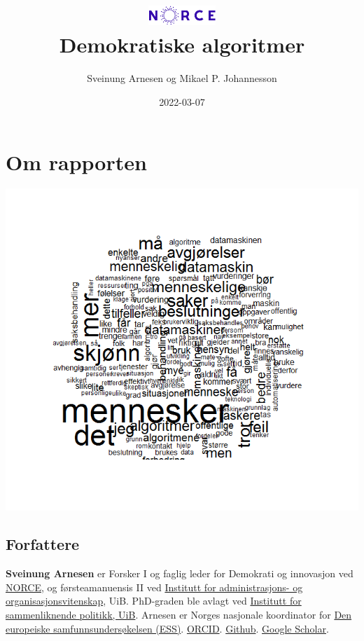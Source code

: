 \documentclass[
]{book}
\title{\includegraphics[width=1in,height=\textheight]{norce_logo.png}\\
Demokratiske algoritmer}
\author{Sveinung Arnesen og Mikael P. Johannesson}
\date{2022-03-07}
\begin{document}
\maketitle

{
\setcounter{tocdepth}{1}
\tableofcontents
}
\hypertarget{om}{%
\chapter{Om rapporten}\label{om}}

\includegraphics{figs/png/nav_ordsky.png}

\hypertarget{forfattere}{%
\section{Forfattere}\label{forfattere}}

\textbf{Sveinung Arnesen} er Forsker I og faglig leder for Demokrati og innovasjon ved \href{https://www.norceresearch.no/personer/sveinung-arnesen}{NORCE}, og førsteamanuensis II ved \href{https://www.uib.no/personer/Sveinung.Arnesen}{Institutt for administrasjons- og organisasjonsvitenskap}, UiB.
PhD-graden ble avlagt ved \href{https://www.uib.no/sampol}{Institutt for sammenliknende politikk, UiB}.
Arnesen er Norges nasjonale koordinator for \href{europeansocialsurvey.org}{Den europeiske samfunnsundersøkelsen (ESS)}. \href{https://orcid.org/0000-0002-2825-0664}{ORCID}. \href{https://github.com/SveinungA/}{Github}. \href{https://scholar.google.com/citations?user=xz8JwjAAAAAJ\&hl=no\&oi=ao}{Google Scholar}.
\end{document}
